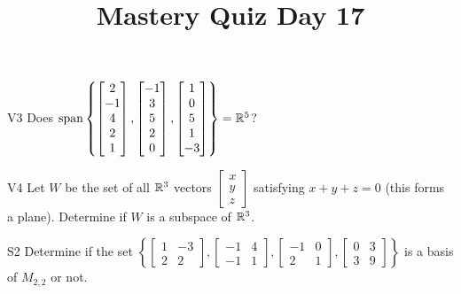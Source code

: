 \documentclass{sbgLAquiz}
\title{Mastery Quiz Day 17 }
\begin{document}
\begin{problem}{V3}
Does
\(
  \operatorname{span}\left\{
    \begin{bmatrix} 2 \\ -1 \\ 4 \\ 2 \\ 1 \end{bmatrix},
    \begin{bmatrix} -1 \\ 3 \\ 5 \\ 2 \\ 0 \end{bmatrix},
    \begin{bmatrix} 1 \\ 0 \\ 5 \\ 1 \\ -3 \end{bmatrix}
  \right\} = \mathbb{R}^5
\)?
\end{problem}

\begin{problem}{V4} Let \(W\) be the set of all \(\mathbb{R}^3\) vectors
\(\begin{bmatrix} x \\ y \\ z \end{bmatrix}\) satisfying \(x+y+z=0\) (this forms a plane).
Determine if \(W\) is a subspace of \(\mathbb{R}^3\).
\end{problem}
\newpage

\begin{problem}{S2}
Determine if the set $\left\{
\begin{bmatrix} 1 & -3 \\ 2 & 2 \end{bmatrix},
\begin{bmatrix} -1 & 4 \\ -1 & 1 \end{bmatrix},
\begin{bmatrix} -1 & 0 \\ 2 & 1 \end{bmatrix},
\begin{bmatrix} 0 & 3 \\ 3 & 9 \end{bmatrix}
\right\}$ is a basis of $M_{2,2}$ or not.
\end{problem}
\end{document}
